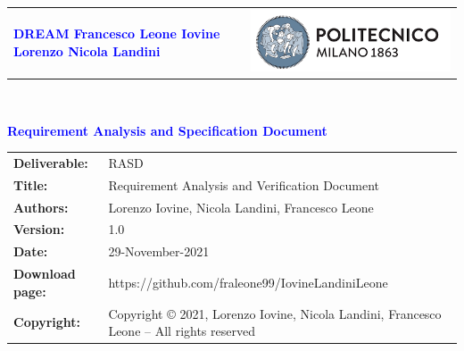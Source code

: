 




\begin{titlepage}



{\begin{table}[t!]
\centering
\begin{tabu} to \textwidth { X[1.0,r,p] X[1.0,l,p] }
\textcolor{Blue}
{\textbf{\small{DREAM \linebreak
Francesco Leone \linebreak Iovine Lorenzo \linebreak Nicola Landini}}} & \includegraphics[scale=0.5]{Images/PolimiLogo}
\end{tabu}
\end{table}}~\\ [7cm]


\begin{flushleft}

{\textcolor{Blue}{\textbf{\Huge{Requirement Analysis and Specification
        Document}}}} \\ [1cm]

\end{flushleft}

\end{titlepage}

\begin{table}[h!]
\begin{tabu} to \textwidth { X[0.3,r,p] X[0.7,l,p] }
\hline

\textbf{Deliverable:} & RASD\\
\textbf{Title:} & Requirement Analysis and Verification Document \\
\textbf{Authors:} & Lorenzo Iovine, Nicola Landini, Francesco Leone\\
\textbf{Version:} & 1.0 \\ 
\textbf{Date:} & 29-November-2021 \\
\textbf{Download page:} & https://github.com/fraleone99/IovineLandiniLeone \\
\textbf{Copyright:} & Copyright © 2021, Lorenzo Iovine, Nicola Landini, Francesco Leone – All rights reserved \\
\hline
\end{tabu}
\end{table}





